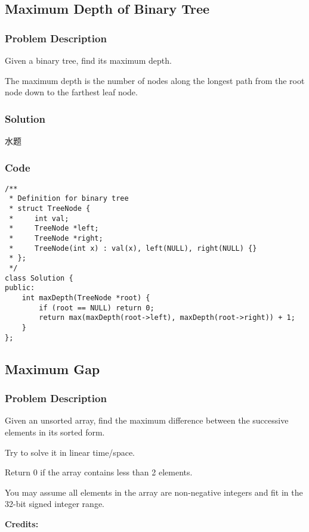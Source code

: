 \documentclass[courier]{article}
\begin{document}
\begin{CJK*}{UTF8}{gkai}
\subsection{ Maximum Depth of Binary Tree }

\subsubsection*{Problem Description}
Given a binary tree, find its maximum depth.

The maximum depth is the number of nodes along the longest path from the root node down to the farthest leaf node.



\subsubsection*{Solution}
水题

\subsubsection*{Code}
\begin{lstlisting}
/**
 * Definition for binary tree
 * struct TreeNode {
 *     int val;
 *     TreeNode *left;
 *     TreeNode *right;
 *     TreeNode(int x) : val(x), left(NULL), right(NULL) {}
 * };
 */
class Solution {
public:
    int maxDepth(TreeNode *root) {
        if (root == NULL) return 0;
        return max(maxDepth(root->left), maxDepth(root->right)) + 1;
    }
}; 
\end{lstlisting}


\subsection{ Maximum Gap }

\subsubsection*{Problem Description}
Given an unsorted array, find the maximum difference between the successive elements in its sorted form.

Try to solve it in linear time/space.

Return 0 if the array contains less than 2 elements.

You may assume all elements in the array are non-negative integers and fit in the 32-bit signed integer range.

\textbf{Credits:}


\end{CJK*}
\end{document}
